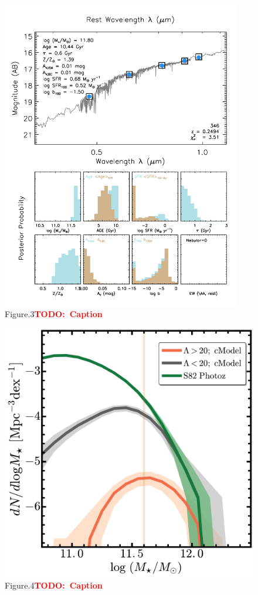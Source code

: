 \documentclass[preprint]{aastex}
\newcommand{\todo}[1]{\textcolor{red}{\textbf{TODO:~#1}}}
\begin{document}
\begin{CJK*}{UTF8}{gbsn}
\clearpage
{}
\begin{figure}
    \centering 
    \includegraphics[width=10.5cm]{fig/redbcg_isedfit_example}
    \caption{Figure.3\todo{Caption}}\label{figure:3}
\end{figure}

\clearpage
{}
\begin{figure}
    \centering 
    \includegraphics[width=14.5cm]{fig/redbcg_hsc_s82}
    \caption{Figure.4\todo{Caption}}\label{figure:4}
\end{figure}


\end{CJK*}
\end{document}
